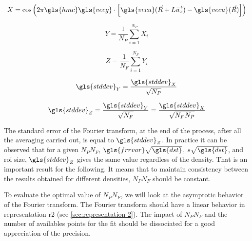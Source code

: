 \begin{equation}
X
= \cos \left( 2 \pi \gls{hmc} \gls{vecg} \cdot \left[ \gls{vecu}( \vec{R} + L \overrightarrow{u_x}) - \gls{vecu}(\vec{R}) \right] \right)
\end{equation}

\smallskip

\begin{minipage}{0.5\linewidth}

\begin{equation}
Y
= \frac{1}{N_P} \sum_{i=1}^{N_P} X_i
\end{equation}

\smallskip

\begin{equation}
Z
= \frac{1}{N_F} \sum_{i=1}^{N_F} Y_i
\end{equation}

\end{minipage}%
\begin{minipage}{0.5\linewidth}

\begin{equation}
\gls{stddev}_Y
= \frac{\gls{stddev}_X}{\sqrt{N_P}}
\end{equation}

\smallskip

\begin{equation}\label{eq:fourier-error}
\gls{stddev}_Z
= \frac{\gls{stddev}_Y}{\sqrt{N_F}}
= \frac{\gls{stddev}_X}{\sqrt{N_F N_P}}
\end{equation}

\end{minipage}

\bigskip

The standard error of the Fourier transform, at the end of the process, after all the averaging carried out, is equal to \( \gls{stddev}_Z \).
In practice it can be observed that for a given \( N_P N_F \), \( \gls{frrvar} \sqrt{\gls{dst}} \), \( s \sqrt{\gls{dst}} \), and \gls{roi} size, \( \gls{stddev}_Z \) gives the same value regardless of the density.
That is an important result for the following.
It means that to maintain consistency between the results obtained for different densities, \( N_P N_F \) should be constant.

\medskip

To evaluate the optimal value of \( N_P N_F \), we will look at the asymptotic behavior of the Fourier transform.
The Fourier transform should have a linear behavior in representation \acrshort{r2} (see \ref{sec:representation-2}).
The impact of \( N_P N_F \) and the number of availables points for the fit should be dissociated for a good appreciation of the precision.

